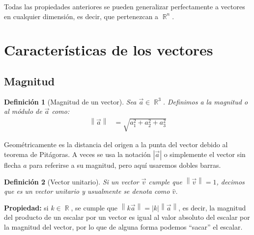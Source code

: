 \documentclass[12pt, fleqn]{report}                             %
\newcommand{\abs}[1]{\left\lvert #1 \right\lvert}               %
\newcommand{\Abs}[1]{\left\lVert #1 \right\lVert}               %
\newtheorem{Definition}{Definición}[section]                    %
\DeclareMathOperator \Reals        {\mathbb{R}}                 %
\begin{document}
            Todas las propiedades anteriores se pueden generalizar perfectamente a vectores en cualquier dimensión, es decir, que pertenezcan a $\Reals^n$.
            











        \clearpage
        \section{Características de los vectores}
        
            \subsection{Magnitud}
            
            \begin{Definition}[Magnitud de un vector]
                Sea $\vec{a} \in \Reals^3$. Definimos a la magnitud o al módulo de $\vec{a}$ como:
                \begin{align}
                    \Abs{\vec{a}} &= \sqrt{a_1^2 + a_2^2 + a_3^2}
                \end{align}
            \end{Definition}
        
            Geométricamente es la distancia del origen a la punta del vector debido al teorema de Pitágoras. A veces se usa la notación $\abs{\vec{a}}$ o simplemente el vector sin flecha $a$ para referirse a su magnitud, pero aquí usaremos dobles barras.
            
            \begin{Definition}[Vector unitario]
                Si un vector $\vec{v}$ cumple que $\Abs{\vec{v}}=1$, decimos que es un \emph{vector unitario} y usualmente se denota como $\hat{v}$.
            \end{Definition}
            
            \textbf{Propiedad:} si $k \in \Reals$, se cumple que $\Abs{k\vec{a}} = \abs{k} \Abs{\vec{a}}$, es decir, la magnitud del producto de un escalar por un vector es igual al valor absoluto del escalar por la magnitud del vector, por lo que de alguna forma podemos ``sacar'' el escalar.
            
\end{document}
